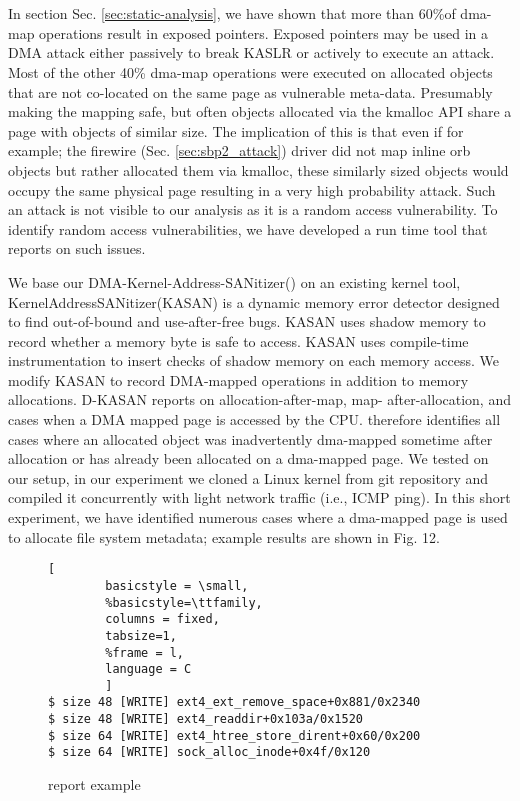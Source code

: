 \section{\dkasan}\label{sec:dma-kasan}

In section Sec. \ref{sec:static-analysis}, we have shown that more than 60\%of dma-map operations result in exposed pointers. Exposed pointers may be used in a DMA attack either passively to break KASLR or actively to execute an attack. Most of the other 40\% dma-map operations were executed on allocated objects that are not co-located on the same page as vulnerable meta-data. Presumably making the mapping safe, but often objects allocated via the kmalloc API share a page with objects of similar size. The implication of this is that even if for example; the firewire (Sec. \ref{sec:sbp2_attack}) driver did not map inline orb objects but rather allocated them via kmalloc, these similarly sized objects would occupy the same physical page resulting in a very high probability attack. Such an attack is not visible to our \tool analysis as it is a random access vulnerability. To identify random access vulnerabilities, we have developed a run time tool that reports on such issues. 

We base our DMA-Kernel-Address-SANitizer(\dkasan) on an existing kernel tool, KernelAddressSANitizer(KASAN)\cite{kasan} is a dynamic memory error detector designed to find out-of-bound and use-after-free bugs. KASAN uses shadow memory to record whether a memory byte is safe to access. KASAN uses compile-time instrumentation to insert checks of shadow memory on each memory access. We modify KASAN to record DMA-mapped operations in addition to memory allocations. D-KASAN reports on allocation-after-map, map- after-allocation, and cases when a DMA mapped page is accessed by the CPU. \dkasan therefore identifies all cases where an allocated object was inadvertently dma-mapped sometime after allocation or has already been allocated on a dma-mapped page. We tested \dkasan on our setup, in our experiment we cloned a Linux kernel from git repository and compiled it concurrently with light network traffic (i.e., ICMP ping). In this short experiment, we have identified numerous cases where a dma-mapped page is used to allocate file system metadata; example results are shown in Fig. 12.

\begin{figure}[t]

        \begin{lstlisting}[
        basicstyle = \small,
        %basicstyle=\ttfamily,
        columns = fixed,
        tabsize=1,
        %frame = l,
        language = C
        ]
$ size 48 [WRITE] ext4_ext_remove_space+0x881/0x2340
$ size 48 [WRITE] ext4_readdir+0x103a/0x1520
$ size 64 [WRITE] ext4_htree_store_dirent+0x60/0x200
$ size 64 [WRITE] sock_alloc_inode+0x4f/0x120
                \end{lstlisting}
        \caption{\dkasan report example}
        \label{fig:dkasan-report}

\end{figure}
